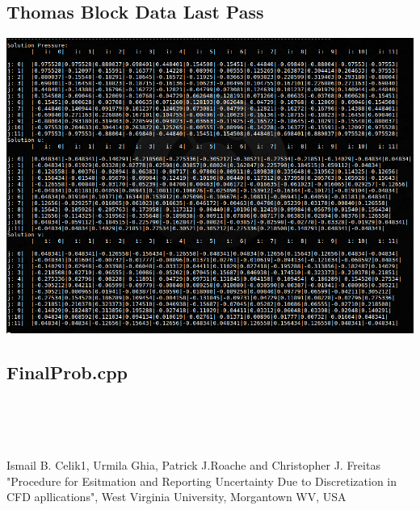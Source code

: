 \documentclass[paper=a4, fontsize=11pt, abstract=on]{scrartcl}
\numberwithin{equation}{section}		%
\numberwithin{figure}{section}			%
\numberwithin{table}{section}				%
\begin{document}
\subsection{Thomas Block Data Last Pass}
\includegraphics[width=0.95\linewidth]{tom}

\subsection{FinalProb.cpp}
\begin{lstlisting}




\end{lstlisting}

\begin{thebibliography}{99} %
Ismail B. Celik1, Urmila Ghia, Patrick J.Roache and Christopher J. Freitas
\newblock "Procedure for Esitmation and Reporting Uncertainty Due to Discretization in CFD apllications",  West Virginia University, Morgantown WV, USA

\end{thebibliography}


\end{document}
